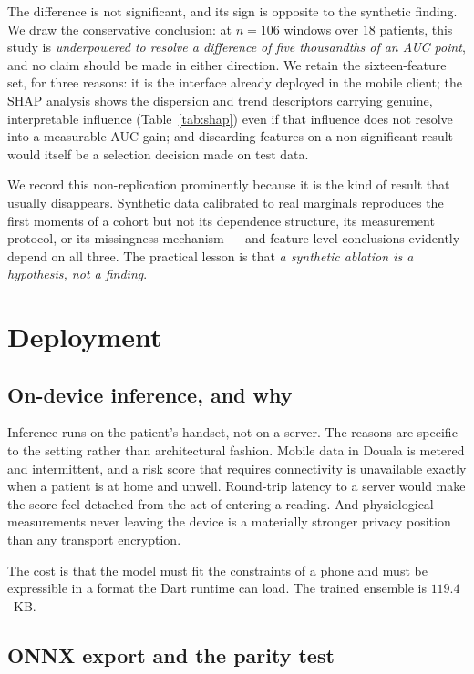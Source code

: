\documentclass[11pt,a4paper]{article}
\begin{document}
The difference is not significant, and its sign is opposite to the synthetic
finding. We draw the conservative conclusion: at $n=106$ windows over $18$
patients, this study is \emph{underpowered to resolve a difference of five
thousandths of an AUC point}, and no claim should be made in either direction.
We retain the sixteen-feature set, for three reasons: it is the interface already
deployed in the mobile client; the SHAP analysis shows the dispersion and trend
descriptors carrying genuine, interpretable influence
(Table~\ref{tab:shap}) even if that influence does not resolve into a measurable
AUC gain; and discarding features on a non-significant result would itself be a
selection decision made on test data.

We record this non-replication prominently because it is the kind of result that
usually disappears. Synthetic data calibrated to real marginals reproduces the
first moments of a cohort but not its dependence structure, its measurement
protocol, or its missingness mechanism --- and feature-level conclusions evidently
depend on all three. The practical lesson is that \emph{a synthetic ablation is a
hypothesis, not a finding}.

\section{Deployment}
\label{sec:deploy}

\subsection{On-device inference, and why}

Inference runs on the patient's handset, not on a server. The reasons are
specific to the setting rather than architectural fashion. Mobile data in Douala is
metered and intermittent, and a risk score that requires connectivity is
unavailable exactly when a patient is at home and unwell. Round-trip latency to a
server would make the score feel detached from the act of entering a reading.
And physiological measurements never leaving the device is a materially stronger
privacy position than any transport encryption.

The cost is that the model must fit the constraints of a phone and must be
expressible in a format the Dart runtime can load. The trained ensemble is
$119.4$~KB.

\subsection{ONNX export and the parity test}
\end{document}
